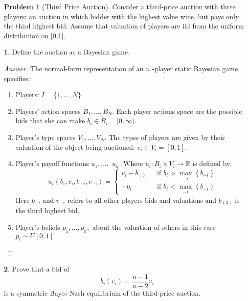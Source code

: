 \documentclass[12pt]{article}
\theoremstyle{definition}
\newtheorem{problem}{Problem}
\newtheorem{subproblem}{}[problem]
\begin{document}
\begin{problem}[Third Price Auction]
Consider a third-price auction with three players: an auction in which bidder with the highest value wins, but pays only the third highest bid. Assume that valuation of players are iid from the uniform distribution on [0,1].
\end{problem}

\begin{subproblem}
Define the auction as a Bayesian game.
\end{subproblem}
\begin{proof}[Answer]
The normal-form representation of an $n$ -player static Bayesian game specifies:
\begin{enumerate}
    \item Players: $I = \{1,\ldots,N\}$
    \item Players' action spaces $B_{1}, \ldots, B_{N}$. Each player actions space are the possible bids that she can make $b_i\in B_i=[0, \infty)$.
    \item Player's type spaces $V_{1}, \ldots, V_{N}$. The types of players are given by their valuation of the object being auctioned: $v_i\in V_i=[0,1]$.
    \item Player's payoff functions $u_{1}, \ldots,$ $u_{n} .$ Where $u_i:B_i\times V_i \to\mathbb{R}$ is defined by:
    $$u_{i}\left(b_{i}, v_{i}, b_{-i}, v_{-i}\right)=\left\{\begin{array}{ll}
v_{i}-b_{(3)} & \text { if } b_{i}>\max_{-i}\left\{b_{-i}\right\} \\
-b_{i} & \text { if } b_{i}<\max_{-i}\left\{b_{-i}\right\}
\end{array}\right.$$
Here $b_{-i}$ and $v_{-i}$ refers to all other players bids and valuations and $b_{(3)}$ is the third highest bid.
    \item Player's beliefs $p_{1}, \ldots, p_{n},$ about the valuation of others in this case $p_i\sim U[0,1]$
\end{enumerate}
\end{proof}

\begin{subproblem}
Prove that a bid of
$$
b_{i}\left(v_{i}\right)=\frac{n-1}{n-2} v_{i}
$$
is a symmetric Bayes-Nash equilibrium of the third-price auction.
\end{subproblem}
\end{document}
